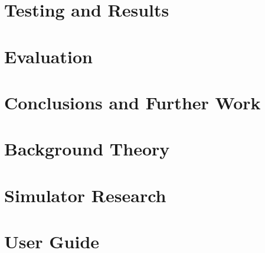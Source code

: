 \documentclass[11pt,a4paper,twoside,openright]{report}
\begin{document}
\chapter{Testing and Results}



\chapter{Evaluation}



\chapter{Conclusions and Further Work}
%




\newpage


\begin{appendices}
\appendix
\chapter{Background Theory}

\chapter{Simulator Research} \label{SimulatorResearch}


\chapter{User Guide} \label{UserGuide}



\end{appendices}
\end{document}
